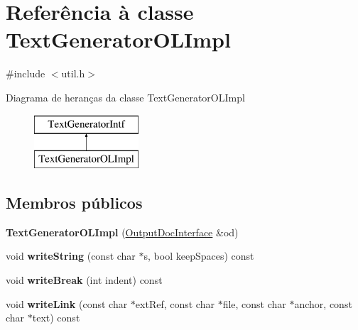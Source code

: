 \hypertarget{class_text_generator_o_l_impl}{\section{Referência à classe Text\-Generator\-O\-L\-Impl}
\label{class_text_generator_o_l_impl}
}


{\ttfamily \#include $<$util.\-h$>$}

Diagrama de heranças da classe Text\-Generator\-O\-L\-Impl\begin{figure}[H]
\begin{center}
\leavevmode
\includegraphics[height=2.000000cm]{class_text_generator_o_l_impl}
\end{center}
\end{figure}
\subsection*{Membros públicos}
\begin{DoxyCompactItemize}
\item 
\hypertarget{class_text_generator_o_l_impl_ac6d3c56dd78767b94d2788f880b3af84}{{\bfseries Text\-Generator\-O\-L\-Impl} (\hyperlink{class_output_doc_interface}{Output\-Doc\-Interface} \&od)}\label{class_text_generator_o_l_impl_ac6d3c56dd78767b94d2788f880b3af84}

\item 
\hypertarget{class_text_generator_o_l_impl_a49452ae8a5acd4e287686e1bdbac5c1f}{void {\bfseries write\-String} (const char $\ast$s, bool keep\-Spaces) const }\label{class_text_generator_o_l_impl_a49452ae8a5acd4e287686e1bdbac5c1f}

\item 
\hypertarget{class_text_generator_o_l_impl_ac40cf1dd4a7804346c00562baa8a74b2}{void {\bfseries write\-Break} (int indent) const }\label{class_text_generator_o_l_impl_ac40cf1dd4a7804346c00562baa8a74b2}

\item 
\hypertarget{class_text_generator_o_l_impl_a1c59b643d4316e056c36a14895ebddaa}{void {\bfseries write\-Link} (const char $\ast$ext\-Ref, const char $\ast$file, const char $\ast$anchor, const char $\ast$text) const }\label{class_text_generator_o_l_impl_a1c59b643d4316e056c36a14895ebddaa}

\end{DoxyCompactItemize}


